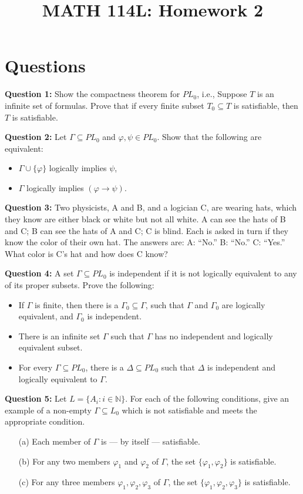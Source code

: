 \documentclass{article}
\title{MATH 114L: Homework 2}
\author{}
\date{}
\begin{document}
\maketitle

\section*{Questions}

\textbf{Question 1:} Show the compactness theorem for \(PL_0\), i.e., Suppose \(T\) is an infinite set of formulas. Prove that if every finite subset \(T_0 \subseteq T\) is satisfiable, then \(T\) is satisfiable.

\textbf{Question 2:} Let \(\Gamma \subseteq PL_0\) and \(\varphi, \psi \in PL_0\). Show that the following are equivalent:
\begin{itemize}
    \item \(\Gamma \cup \{\varphi\}\) logically implies \(\psi\),
    \item \(\Gamma\) logically implies \((\varphi \to \psi)\).
\end{itemize}

\textbf{Question 3:} Two physicists, A and B, and a logician C, are wearing hats, which they know are either black or white but not all white. A can see the hats of B and C; B can see the hats of A and C; C is blind. Each is asked in turn if they know the color of their own hat. The answers are: A: “No.” B: “No.” C: “Yes.” What color is C’s hat and how does C know?

\textbf{Question 4:} A set \(\Gamma \subseteq PL_0\) is independent if it is not logically equivalent to any of its proper subsets. Prove the following:
\begin{itemize}
    \item If \(\Gamma\) is finite, then there is a \(\Gamma_0 \subseteq \Gamma\), such that \(\Gamma\) and \(\Gamma_0\) are logically equivalent, and \(\Gamma_0\) is independent.
    \item There is an infinite set \(\Gamma\) such that \(\Gamma\) has no independent and logically equivalent subset.
    \item For every \(\Gamma \subseteq PL_0\), there is a \(\Delta \subseteq PL_0\) such that \(\Delta\) is independent and logically equivalent to \(\Gamma\).
\end{itemize}

\textbf{Question 5:} Let \(L = \{A_i : i \in \mathbb{N}\}\). For each of the following conditions, give an example of a non-empty \(\Gamma \subseteq L_0\) which is not satisfiable and meets the appropriate condition.
\begin{itemize}
    \item[(a)] Each member of \(\Gamma\) is — by itself — satisfiable.
    \item[(b)] For any two members \(\varphi_1\) and \(\varphi_2\) of \(\Gamma\), the set \(\{\varphi_1, \varphi_2\}\) is satisfiable.
    \item[(c)] For any three members \(\varphi_1, \varphi_2, \varphi_3\) of \(\Gamma\), the set \(\{\varphi_1, \varphi_2, \varphi_3\}\) is satisfiable.
\end{itemize}
\end{document}
